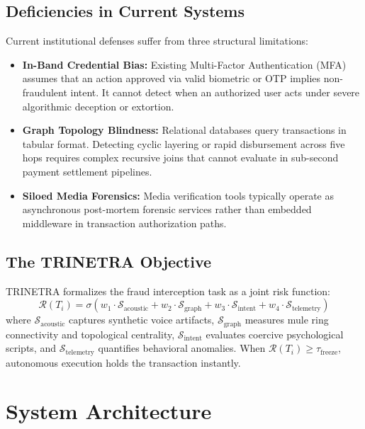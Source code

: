\documentclass[10pt,journal,compsoc]{IEEEtran}
\begin{document}
\subsection{Deficiencies in Current Systems}
Current institutional defenses suffer from three structural limitations:
\begin{itemize}
    \item \textbf{In-Band Credential Bias:} Existing Multi-Factor Authentication (MFA) assumes that an action approved via valid biometric or OTP implies non-fraudulent intent. It cannot detect when an authorized user acts under severe algorithmic deception or extortion.
    \item \textbf{Graph Topology Blindness:} Relational databases query transactions in tabular format. Detecting cyclic layering or rapid disbursement across five hops requires complex recursive joins that cannot evaluate in sub-second payment settlement pipelines.
    \item \textbf{Siloed Media Forensics:} Media verification tools typically operate as asynchronous post-mortem forensic services rather than embedded middleware in transaction authorization paths.
\end{itemize}

\subsection{The TRINETRA Objective}
TRINETRA formalizes the fraud interception task as a joint risk function:
\begin{equation}
    \mathcal{R}(T_i) = \sigma \left( w_1 \cdot \mathcal{S}_{\text{acoustic}} + w_2 \cdot \mathcal{S}_{\text{graph}} + w_3 \cdot \mathcal{S}_{\text{intent}} + w_4 \cdot \mathcal{S}_{\text{telemetry}} \right)
\end{equation}
where $\mathcal{S}_{\text{acoustic}}$ captures synthetic voice artifacts, $\mathcal{S}_{\text{graph}}$ measures mule ring connectivity and topological centrality, $\mathcal{S}_{\text{intent}}$ evaluates coercive psychological scripts, and $\mathcal{S}_{\text{telemetry}}$ quantifies behavioral anomalies. When $\mathcal{R}(T_i) \ge \tau_{\text{freeze}}$, autonomous execution holds the transaction instantly.

\section{System Architecture}
\label{sec:architecture}
\end{document}

